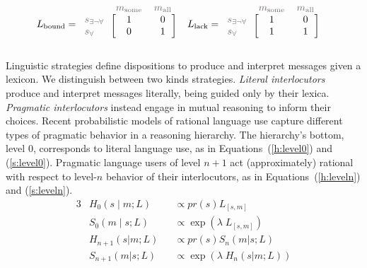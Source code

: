 \documentclass[a4paper, 11pt]{article}
\theoremstyle{Satz}
\newcommand{\state}{\ensuremath{s}\xspace}		%
\newcommand{\mystate}[1]{\ensuremath{\state_{\text{#1}}}\xspace} %
\newcommand{\mylang}[1]{\ensuremath{L_{\text{#1}}}\xspace} %
\newcommand{\messg}{\ensuremath{m}\xspace}		%
\newcommand{\mymessg}[1]{\ensuremath{\messg_{\text{#1}}}\xspace} %
\newcommand{\ssome}{\mystate{\ensuremath{\exists\neg\forall}}}
\newcommand{\sall}{\mystate{\ensuremath{\forall}}}
\newcommand{\msome}{\mymessg{some}}
\newcommand{\mall}{\mymessg{all}}
\newcommand{\Lbound}{\mylang{bound}}
\newcommand{\Llack}{\mylang{lack}}
\newcommand{\mygray}[1]{{\textcolor{mygray}{#1}}}
\begin{document}
\begin{align*}
  \Lbound & = \begin{blockarray}{lcc}
    & \mygray{\msome} & \mygray{\mall} \\
    \begin{block}{l[cc]}
      \mygray{\ssome} & 1 & 0 \\
      \mygray{\sall}  & 0 & 1 \\
    \end{block}
  \end{blockarray} &
  \Llack & = \begin{blockarray}{lcc}
    & \mygray{\msome} & \mygray{\mall} \\
    \begin{block}{l[cc]}
      \mygray{\ssome} & 1 & 0 \\
      \mygray{\sall}  & 1 & 1 \\
    \end{block}
  \end{blockarray}
\end{align*}

Linguistic strategies define dispositions to produce and interpret messages given a lexicon. We
distinguish between two kinds strategies. {\em Literal interlocutors} produce and
interpret messages literally, being guided only by their lexica. {\em Pragmatic interlocutors}
instead engage in mutual reasoning to inform their choices. Recent probabilistic models of
rational language use
\citep{frank+goodman:2012,FrankeJager2015:Probabilistic-p,GoodmanFrank2016:Pragmatic-Langu}
capture different types of pragmatic behavior in a reasoning hierarchy. The hierarchy's bottom,
level $0$, corresponds to literal language use, as in Equations~(\ref{h:level0}) and
(\ref{s:level0}). Pragmatic language users of level $n + 1$ act (approximately) rational with
respect to level-$n$ behavior of their interlocutors, as in Equations~(\ref{h:leveln}) and
(\ref{s:leveln}).
\begin{alignat}{3}
&H_{0}(s \mid m;L) &&\propto pr(s) L_{[s,m]} \label{h:level0}\\
&S_{0}(m \mid s;L) &&\propto \exp(\lambda \; L_{[s,m]}) \label{s:level0}\\
&H_{n+1}(s|m;L) &&\propto pr(s) S_{n}(m|s;L) \label{h:leveln}\\
&S_{n+1}(m|s;L) &&\propto  \exp(\lambda \; H_{n}(s|m;L)) \label{s:leveln}
\end{alignat}
\end{document}

